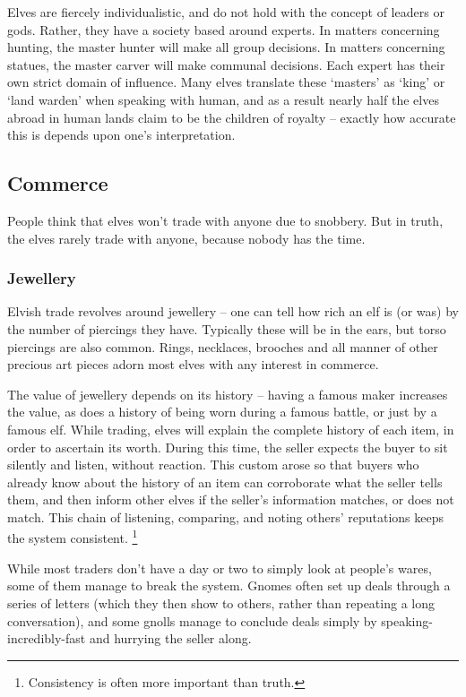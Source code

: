 \begin{multicols}{2}
Elves are fiercely individualistic, and do not hold with the concept of leaders or gods.
Rather, they have a society based around experts.
In matters concerning hunting, the master hunter will make all group decisions.
In matters concerning statues, the master carver will make communal decisions.
Each expert has their own strict domain of influence.
Many elves translate these `masters' as `king' or `land warden' when speaking with human, and as a result nearly half the elves abroad in human lands claim to be the children of royalty -- exactly how accurate this is depends upon one's interpretation.

\subsection{Commerce}

People think that elves won't trade with anyone due to snobbery.
But in truth, the elves rarely trade with anyone, because nobody has the time.

\subsubsection{Jewellery}

Elvish trade revolves around jewellery -- one can tell how rich an elf is (or was) by the number of piercings they have.
Typically these will be in the ears, but torso piercings are also common.
Rings, necklaces, brooches and all manner of other precious art pieces adorn most elves with any interest in commerce.

The value of jewellery depends on its history -- having a famous maker increases the value, as does a history of being worn during a famous battle, or just by a famous elf.
While trading, elves will explain the complete history of each item, in order to ascertain its worth.
During this time, the seller expects the buyer to sit silently and listen, without reaction.
This custom arose so that buyers who already know about the history of an item can corroborate what the seller tells them, and then inform other elves if the seller's information matches, or does not match.
This chain of listening, comparing, and noting others' reputations keeps the system consistent.%
\footnote{Consistency is often more important than truth.}

While most traders don't have a day or two to simply look at people's wares, some of them manage to break the system.
Gnomes often set up deals through a series of letters (which they then show to others, rather than repeating a long conversation), and some gnolls manage to conclude deals simply by {\small speaking-incredibly-fast} and hurrying the seller along.


\end{multicols}
